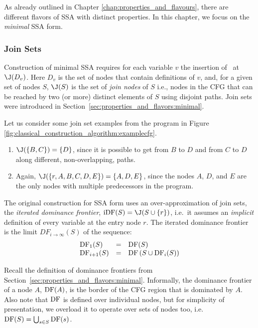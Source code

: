 As already outlined in Chapter \ref{chap:properties_and_flavours},
there are different flavors of SSA with distinct properties.
In this chapter, we focus on the \textit{minimal} SSA form.

\subsubsection*{Join Sets}

Construction of minimal SSA 
requires for each variable $v$ the insertion of \phiops\ at $\join(D_v)$.
Here $D_v$ is the set of nodes that contain definitions of $v$, and,
for a given set of nodes $S$, $\join(S)$ is the set of
\textit{join nodes} of $S$
i.e., nodes in the CFG that can be reached by
two (or more) distinct elements of $S$ using disjoint paths.
Join sets were introduced in Section~\ref{sec:properties_and_flavors:minimal}.

Let us consider some join set examples from the
program in Figure \ref{fig:classical_construction_algorithm:examplecfg}.
\begin{enumerate}
\item $\join(\{B,C\}) = \{D\}$, since it is possible to get from $B$ to $D$
and from $C$ to $D$ along different, non-overlapping, paths.
\item Again, $\join(\{r, A, B, C, D, E \}) = \{A,D,E\}$, since the nodes
$A$, $D$, and $E$ are the only nodes with multiple predecessors in
the program.
\end{enumerate}

 
The original construction for SSA form uses an over-approximation of
join sets, the
\emph{iterated dominance frontier}, $\iDF(S)=\join(S\cup
\{r\})$, i.e.\ it assumes an \emph{implicit} definition of every
variable at the entry node $r$.
The iterated dominance frontier is the limit $DF_{i\rightarrow\infty}(S)$
of the sequence:
$$\begin{array}{lll}
\mathrm{DF}_1(S) & = & \mathrm{DF}(S)\\
\mathrm{DF}_{i+1}(S) & = & \mathrm{DF}\left(S\cup \mathrm{DF}_i(S)\right)
\end{array}$$

Recall the definition of dominance frontiers from Section~\ref{sec:properties_and_flavors:minimal}.
Informally, the dominance frontier of a node $A$, $\mathrm{DF}(A)$,
is the border of the CFG region that is dominated by $A$.
Also note that $\mathrm{DF}$ is defined over individual nodes, 
but for simplicity of presentation, we overload it to 
operate over sets of nodes too, i.e.\ 
$\mathrm{DF}(S) = \bigcup_{s\in S} \mathrm{DF}(s)$.

